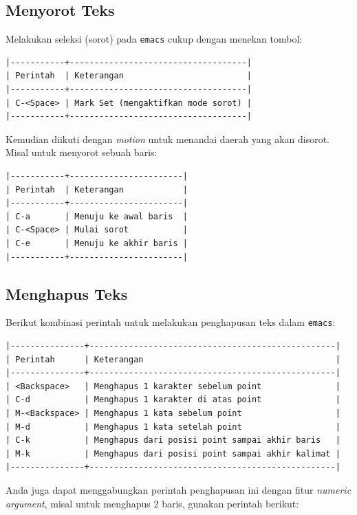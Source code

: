 \documentclass{article}
\begin{document}
\subsection{Menyorot Teks}
Melakukan seleksi (sorot) pada \verb=emacs= cukup dengan menekan tombol:

\begin{verbatim}
|-----------+------------------------------------|
| Perintah  | Keterangan                         |
|-----------+------------------------------------|
| C-<Space> | Mark Set (mengaktifkan mode sorot) |
|-----------+------------------------------------|
\end{verbatim}

Kemudian diikuti dengan \emph{motion} untuk menandai daerah yang akan disorot.
Misal untuk menyorot sebuah baris:

\begin{verbatim}
|-----------+-----------------------|
| Perintah  | Keterangan            |
|-----------+-----------------------|
| C-a       | Menuju ke awal baris  |
| C-<Space> | Mulai sorot           |
| C-e       | Menuju ke akhir baris |
|-----------+-----------------------|
\end{verbatim}

\subsection{Menghapus Teks}

Berikut kombinasi perintah untuk melakukan penghapusan teks dalam \verb=emacs=:

\begin{verbatim}
|---------------+--------------------------------------------------|
| Perintah      | Keterangan                                       |
|---------------+--------------------------------------------------|
| <Backspace>   | Menghapus 1 karakter sebelum point               |
| C-d           | Menghapus 1 karakter di atas point               |
| M-<Backspace> | Menghapus 1 kata sebelum point                   |
| M-d           | Menghapus 1 kata setelah point                   |
| C-k           | Menghapus dari posisi point sampai akhir baris   |
| M-k           | Menghapus dari posisi point sampai akhir kalimat |
|---------------+--------------------------------------------------|
\end{verbatim}

Anda juga dapat menggabungkan perintah penghapusan ini dengan fitur
\emph{numeric argument}, misal untuk menghapus 2 baris, gunakan perintah 
berikut:
\end{document}

